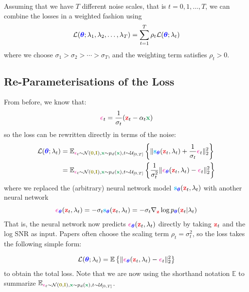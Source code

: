 \documentclass[usenames,dvipsnames]{article}
\DeclarePairedDelimiter{\norm}{\lVert}{\rVert}
\newcommand{\myvec}[1]{\mathbf{#1}}
\newcommand{\myvecsym}[1]{\boldsymbol{#1}}
\newcommand{\vx}{\myvec{\textcolor{ForestGreen}{x}}}
\newcommand{\vz}{\myvec{\textcolor{Red}{z}}}
\newcommand{\vs}{\myvec{\textcolor{Cyan}{s}}}
\newcommand{\vzero}{\myvec{\textcolor{olive}{0}}}
\newcommand{\vI}{\myvec{\textcolor{olive}{I}}}
\newcommand{\vtheta}{\myvecsym{\textcolor{blue}{\theta}}}
\newcommand{\vepsilon}{\myvecsym{\textcolor{CarnationPink}{\epsilon}}}
\newcommand{\loss}{{\cal L}}
\newcommand{\gauss}{\mathcal{N}}
\newcommand{\E}{\mathbb{E}} %
\newcommand{\pT}{p_{\vtheta}}
\newcommand{\be}{\begin{equation}}
\newcommand{\ee}{\end{equation}}
\begin{document}
Assuming that we have $T$ different noise scales, that is $t=0,1, \ldots, T$,
we can combine the losses in a weighted fashion using
\begin{align}
\loss(\vtheta; \lambda_{1}, \lambda_{2}, \ldots, \lambda_T)
= \sum_{t=1}^T  \rho_t \loss(\vtheta;\lambda_t)
\end{align}
where we choose $\sigma_1 > \sigma_2 > \cdots > \sigma_T$,
and the weighting term satisfies $\rho_t > 0$.





\subsection{Re-Parameterisations of the Loss}

From before, we know that:
\begin{align}
\vepsilon_t = \frac{1}{\sigma_t}(\vz_t - \alpha_t \vx)
\nonumber
\end{align}
so the loss can be rewritten directly in terms of the noise:
\begin{align}
  \loss(\vtheta;\lambda_t)
&=
 \E_{\vepsilon_t \sim \gauss(\vzero,\vI), \vx \sim p_d(\vx), t \sim {\cal U}_{[0,T]}}
 \left\{  
 \norm{\vs_{\vtheta}(\vz_t,\lambda_t)
   + \frac{1}{\sigma_t}\vepsilon_t }_2^2 \right\}
\nonumber \\
&=
 \E_{\vepsilon_t \sim \gauss(\vzero,\vI), \vx \sim p_d(\vx), t \sim {\cal U}_{[0,T]}}
 \left\{  \frac{1}{\sigma_t^2}
 \norm{\vepsilon_{\vtheta}(\vz_t,\lambda_t)
   - \vepsilon_t }_2^2 \right\}
\nonumber
\end{align}
where we replaced the (arbitrary) neural network model $\vs_{\vtheta}(\vz_t,\lambda_t)$ with another neural network
\be
\vepsilon_{\vtheta}(\vz_t,\lambda_t) = - \sigma_t \vs_{\vtheta}(\vz_t,\lambda_t) = - \sigma_t \nabla_\vz \log \pT(\vz_t | \lambda_t) \nonumber
\ee
That is, the neural network now predicts $\vepsilon_{\vtheta}(\vz_t,\lambda_t)$ directly by taking $\vz_t$ and the log SNR as input. Papers often choose the scaling term $\rho_t = \sigma_t^2$, so the loss takes the following simple form:

\begin{align}
  \loss(\vtheta;\lambda_t)
=
 \E
 \left\{  
 \norm{\vepsilon_{\vtheta}(\vz_t,\lambda_t)
   - \vepsilon_t }_2^2 \right\}
\end{align}
to obtain the total loss. Note that we are now using the shorthand notation $\E$ to summarize $\E_{\vepsilon_t \sim \gauss(\vzero,\vI), \vx \sim p_d(\vx), t \sim {\cal U}_{[0,T]}}$.
\end{document}
